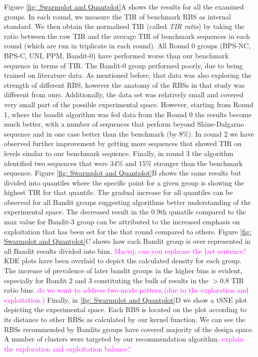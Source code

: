 \documentclass{article}
\newcommand{\mengyan}[1]{\textcolor{magenta}{#1}}
\begin{document}
Figure \ref{fig: Swarmplot and Quantplot}A shows the results for all the examined groups. 
In each round, we measure the TIR of benchmark RBS as internal standard. 
We then obtain the normalised TIR (called \textit{TIR ratio}) by taking the ratio between the raw TIR and the average TIR of benchmark sequences in each round (which are run in triplicate in each round).
All Round 0 groups (BPS-NC, BPS-C, UNI, PPM, Bandit-0) have performed worse than our benchmark sequence in terms of TIR. 
The Bandit-0 group performed poorly, due to being trained on literature data.
As mentioned before, that data was also exploring the strength of different RBS, however the anatomy of the RBSs in that study was different from ours.
Additionally, the data set was relatively small and covered very small part of the possible experimental space.
However, starting from Round 1, where the bandit algorithm was fed data from the Round 0 the results become much better, with a number of sequences that perform beyond Shine-Dalgarno sequence and in one case better than the benchmark (by 8\%).
In round 2 we have observed further improvement by getting more sequences that showed TIR on levels similar to our benchmark sequence.
Finally, in round 3 the algorithm identified two sequences that were 34\% and 15\% stronger than the benchmark sequence.
Figure \ref{fig: Swarmplot and Quantplot}B shows the same results but divided into quantiles where the specific point for a given group is showing the highest TIR for that quantile.
The gradual increase for all quantiles can be observed for all Bandit groups suggesting algorithms better understanding of the experimental space.
The decreased result in the 0.9th qunatile compared to the max value for Bandit-3 group can be attributed to the increased emphasis on exploitation that has been set for the that round compared to others.
Figure \ref{fig: Swarmplot and Quantplot}C shows how each Bandit group is over represented in all Bandit results divided into bins. 
\mengyan{Maciej: can you rephrase the last sentence?}
KDE plots have been overlaid to depict the calculated density for each group.
The increase of prevalence of later bandit groups in the higher bins is evident, especially for Bandit 2 and 3 constituting the bulk of results in the $>0.8$ TIR ratio bins.
\mengyan{do we want to address two-mode pattern (due to the exploration and exploitation.)}
Finally, in \ref{fig: Swarmplot and Quantplot}D we show a tSNE plot depicting the experimental space.
Each RBS is located on the plot according to its distance to other RBSs as calculated by our kernel function.
We can see the RBSs recommended by Bandits groups have covered majority of the design space. 
A number of clusters were targeted by our recommendation algorithm.
\mengyan{explain the exploration and exploitation balance?}
\end{document}
